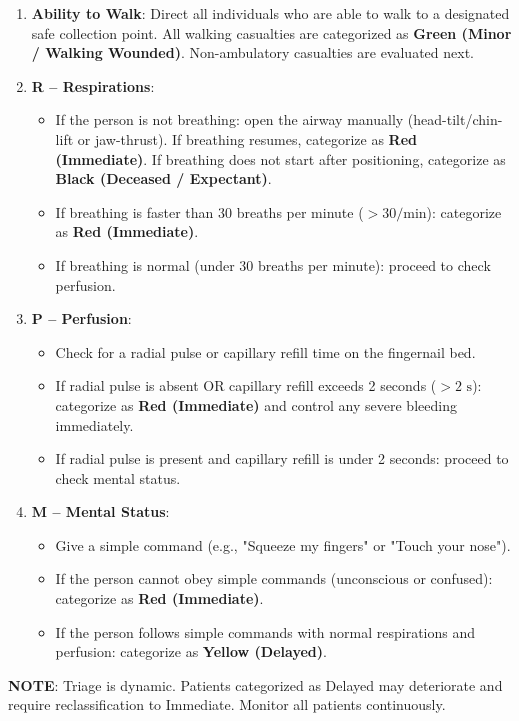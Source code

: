 \begin{enumerate}
  \item \textbf{Ability to Walk}: Direct all individuals who are able to walk to a designated safe collection point. All walking casualties are categorized as \textbf{Green (Minor / Walking Wounded)}. Non-ambulatory casualties are evaluated next.
  \item \textbf{R -- Respirations}:
    \begin{itemize}
      \item If the person is not breathing: open the airway manually (head-tilt/chin-lift or jaw-thrust). If breathing resumes, categorize as \textbf{Red (Immediate)}. If breathing does not start after positioning, categorize as \textbf{Black (Deceased / Expectant)}.
      \item If breathing is faster than 30 breaths per minute ($>30/\text{min}$): categorize as \textbf{Red (Immediate)}.
      \item If breathing is normal (under 30 breaths per minute): proceed to check perfusion.
    \end{itemize}
  \item \textbf{P -- Perfusion}:
    \begin{itemize}
      \item Check for a radial pulse or capillary refill time on the fingernail bed.
      \item If radial pulse is absent OR capillary refill exceeds 2 seconds ($>2\text{ s}$): categorize as \textbf{Red (Immediate)} and control any severe bleeding immediately.
      \item If radial pulse is present and capillary refill is under 2 seconds: proceed to check mental status.
    \end{itemize}
  \item \textbf{M -- Mental Status}:
    \begin{itemize}
      \item Give a simple command (e.g., "Squeeze my fingers" or "Touch your nose").
      \item If the person cannot obey simple commands (unconscious or confused): categorize as \textbf{Red (Immediate)}.
      \item If the person follows simple commands with normal respirations and perfusion: categorize as \textbf{Yellow (Delayed)}.
    \end{itemize}
\end{enumerate}

\noindent\textbf{NOTE}: Triage is dynamic. Patients categorized as Delayed may deteriorate and require reclassification to Immediate. Monitor all patients continuously.

